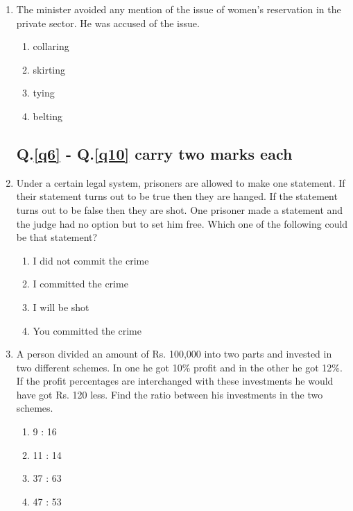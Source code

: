 \documentclass[journal,12pt,onecolumn]{IEEEtran}
\theoremstyle{remark}
\begin{document}
\begin{enumerate}
    \item The minister avoided any mention of the issue of women's reservation in the private sector. He was accused of \underline{\hspace{2cm}}the issue.
    \begin{enumerate}
        \item collaring
        \item skirting
        \item tying
        \item belting
    \end{enumerate}

    \subsection*{Q.\ref{q6} - Q.\ref{q10} carry two marks each}

    \item \label{q6} Under a certain legal system, prisoners are allowed to make one statement. If their statement turns out to be true then they are hanged. If the statement turns out to be false then they are shot. One prisoner made a statement and the judge had no option but to set him free. Which one of the following could be that statement?
    \begin{enumerate}
        \item I did not commit the crime
        \item I committed the crime
        \item I will be shot
        \item You committed the crime
    \end{enumerate}

    \item \label{Q7} A person divided an amount of Rs. 100,000 into two parts and invested in two different schemes. In one he got 10\% profit and in the other he got 12\%. If the profit percentages are interchanged with these investments he would have got Rs. 120 less. Find the ratio between his investments in the two schemes.
    \begin{enumerate}
        \item 9 : 16
        \item 11 : 14
        \item 37 : 63
        \item 47 : 53
    \end{enumerate}


\end{enumerate}
\end{document}
